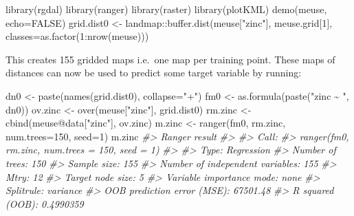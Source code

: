 \documentclass[
  graybox,natbib,nospthms]{svmono}
\newenvironment{Shaded}{\begin{snugshade}}{\end{snugshade}}
\newcommand{\AttributeTok}[1]{\textcolor[rgb]{0.61,0.61,0.61}{#1}}
\newcommand{\CommentTok}[1]{\textcolor[rgb]{0.37,0.37,0.37}{\textit{#1}}}
\newcommand{\ConstantTok}[1]{\textcolor[rgb]{0,0,0}{#1}}
\newcommand{\DecValTok}[1]{\textcolor[rgb]{0.06,0.06,0.06}{#1}}
\newcommand{\FunctionTok}[1]{\textcolor[rgb]{0,0,0}{#1}}
\newcommand{\NormalTok}[1]{#1}
\newcommand{\OtherTok}[1]{\textcolor[rgb]{0.37,0.37,0.37}{#1}}
\newcommand{\SpecialCharTok}[1]{\textcolor[rgb]{0,0,0}{#1}}
\newcommand{\StringTok}[1]{\textcolor[rgb]{0.5,0.5,0.5}{#1}}
\begin{document}
\begin{Shaded}
\begin{Highlighting}[]
\FunctionTok{library}\NormalTok{(rgdal)}
\FunctionTok{library}\NormalTok{(ranger)}
\FunctionTok{library}\NormalTok{(raster)}
\FunctionTok{library}\NormalTok{(plotKML)}
\FunctionTok{demo}\NormalTok{(meuse, }\AttributeTok{echo=}\ConstantTok{FALSE}\NormalTok{)}
\NormalTok{grid.dist0 }\OtherTok{\textless{}{-}}\NormalTok{ landmap}\SpecialCharTok{::}\FunctionTok{buffer.dist}\NormalTok{(meuse[}\StringTok{"zinc"}\NormalTok{], meuse.grid[}\DecValTok{1}\NormalTok{], }
                                   \AttributeTok{classes=}\FunctionTok{as.factor}\NormalTok{(}\DecValTok{1}\SpecialCharTok{:}\FunctionTok{nrow}\NormalTok{(meuse)))}
\end{Highlighting}
\end{Shaded}

This creates 155 gridded maps i.e.~one map per training point. These maps of
distances can now be used to predict some target variable by running:

\begin{Shaded}
\begin{Highlighting}[]
\NormalTok{dn0 }\OtherTok{\textless{}{-}} \FunctionTok{paste}\NormalTok{(}\FunctionTok{names}\NormalTok{(grid.dist0), }\AttributeTok{collapse=}\StringTok{"+"}\NormalTok{)}
\NormalTok{fm0 }\OtherTok{\textless{}{-}} \FunctionTok{as.formula}\NormalTok{(}\FunctionTok{paste}\NormalTok{(}\StringTok{"zinc \textasciitilde{} "}\NormalTok{, dn0))}
\NormalTok{ov.zinc }\OtherTok{\textless{}{-}} \FunctionTok{over}\NormalTok{(meuse[}\StringTok{"zinc"}\NormalTok{], grid.dist0)}
\NormalTok{rm.zinc }\OtherTok{\textless{}{-}} \FunctionTok{cbind}\NormalTok{(meuse}\SpecialCharTok{@}\NormalTok{data[}\StringTok{"zinc"}\NormalTok{], ov.zinc)}
\NormalTok{m.zinc }\OtherTok{\textless{}{-}} \FunctionTok{ranger}\NormalTok{(fm0, rm.zinc, }\AttributeTok{num.trees=}\DecValTok{150}\NormalTok{, }\AttributeTok{seed=}\DecValTok{1}\NormalTok{)}
\NormalTok{m.zinc}
\CommentTok{\#\textgreater{} Ranger result}
\CommentTok{\#\textgreater{} }
\CommentTok{\#\textgreater{} Call:}
\CommentTok{\#\textgreater{}  ranger(fm0, rm.zinc, num.trees = 150, seed = 1) }
\CommentTok{\#\textgreater{} }
\CommentTok{\#\textgreater{} Type:                             Regression }
\CommentTok{\#\textgreater{} Number of trees:                  150 }
\CommentTok{\#\textgreater{} Sample size:                      155 }
\CommentTok{\#\textgreater{} Number of independent variables:  155 }
\CommentTok{\#\textgreater{} Mtry:                             12 }
\CommentTok{\#\textgreater{} Target node size:                 5 }
\CommentTok{\#\textgreater{} Variable importance mode:         none }
\CommentTok{\#\textgreater{} Splitrule:                        variance }
\CommentTok{\#\textgreater{} OOB prediction error (MSE):       67501.48 }
\CommentTok{\#\textgreater{} R squared (OOB):                  0.4990359}
\end{Highlighting}
\end{Shaded}
\end{document}
